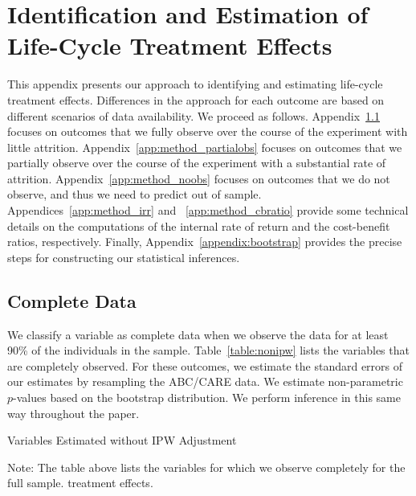 \section{Identification and Estimation of Life-Cycle Treatment Effects} \label{appendix:methodology}

This appendix presents our approach to identifying and estimating life-cycle treatment effects. Differences in the approach for each outcome are based on different scenarios of data availability. We proceed as follows. Appendix~\ref{app:method_fullobs} focuses on outcomes that we fully observe over the course of the experiment with little attrition. Appendix~\ref{app:method_partialobs} focuses on outcomes that we partially observe over the course of the experiment with a substantial rate of attrition. Appendix~\ref{app:method_noobs}  focuses on outcomes that we do not observe, and thus we need to predict out of sample. Appendices~\ref{app:method_irr} and ~\ref{app:method_cbratio} provide some technical details on the computations of the internal rate of return and the cost-benefit ratios, respectively. Finally, Appendix~\ref{appendix:bootstrap} provides the precise steps for constructing our statistical inferences.

\subsection{Complete Data}\label{app:method_fullobs}

We classify a variable as complete data when we observe the data for at least 90\% of the individuals in the sample. Table~\ref{table:nonipw} lists the variables that are completely observed. For these outcomes, we estimate the standard errors of our estimates by resampling the ABC/CARE data. We estimate non-parametric $p$-values based on the bootstrap distribution. We perform inference in this same way throughout the paper.

\begin{table}[H]
\begin{threeparttable}
\caption{Variables Estimated without IPW Adjustment}
\label{table:nonipw}
\centering

\begin{tablenotes}
\footnotesize
\item Note: The table above lists the variables for which we observe completely for the full sample.
treatment effects.
\end{tablenotes}
\end{threeparttable}
\end{table}

